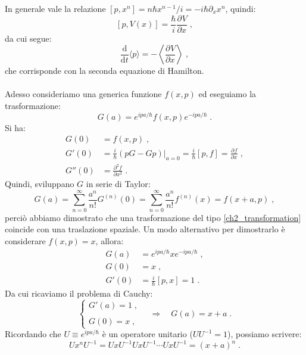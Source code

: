 \documentclass[10pt,a4paper]{report}
\theoremstyle{definition}
\newcommand{\pdev}[3][]{\frac{\partial^{#1} #2}{\partial #3^{#1}}}
\numberwithin{equation}{section}
\newcommand{\diff}[1][]{\mathrm{d}#1}
\newcommand{\bra}{\langle}
\newcommand{\ket}{\rangle}
\begin{document}
In generale vale la relazione $[p,x^n]=n\hbar x^{n-1}/i=-i\hbar\partial_x x^n$, quindi:
$$
[p,V(x)]=\frac{\hbar}{i}\pdev{V}{x}\;,
$$
da cui segue:
\begin{equation}
\frac{\mathrm{d}}{\diff{t}}\bra p\ket=-\left\langle\pdev{V}{x}\right\rangle\;,
\end{equation}
che corrisponde con la seconda equazione di Hamilton. \\
\\
Adesso consideriamo una generica funzione $f(x,p)$ ed eseguiamo la trasformazione:
\begin{equation}
G(a)=e^{ipa/\hbar}f(x,p)e^{-ipa/\hbar}\;. \label{ch2_transformation}
\end{equation}
Si ha:
\begin{align*}
G(0) &=f(x,p)\;, \\
G'(0) &= \frac{i}{\hbar}\left.(pG-Gp)\right|_{a=0}=\frac{i}{\hbar}[p,f]=\pdev{f}{x}\;, \\
G''(0) &= \pdev[2]{f}{x}\;.
\end{align*}
Quindi, sviluppano $G$ in serie di Taylor:
$$
G(a)=\sum_{n=0}^{\infty}\frac{a^n}{n!}G^{(n)}(0)=\sum_{n=0}^{\infty} \frac{a^n}{n!}f^{(n)}(x)=f(x+a,p)\;,
$$
perciò abbiamo dimostrato che una trasformazione del tipo \eqref{ch2_transformation} coincide con una traslazione spaziale. Un modo alternativo per dimostrarlo è considerare $f(x,p)=x$, allora:
\begin{align*}
G(a) &= e^{ipa/\hbar}xe^{-ipa/\hbar}\;, \\
G(0) &= x\;, \\
G'(0)&=\frac{i}{\hbar}[p,x]=1\;.
\end{align*}
Da cui ricaviamo il problema di Cauchy:
\begin{equation}
\begin{cases}
G'(a)=1\;, \\
\\
G(0)=x\;,
\end{cases}\quad \Longrightarrow\quad G(a)=x+a\;.
\end{equation}
Ricordando che $U\equiv e^{ipa/\hbar}$ è un operatore unitario ($UU^{-1}=1$), possiamo scrivere:
$$
Ux^nU^{-1}=UxU^{-1}UxU^{-1}\cdots UxU^{-1}=(x+a)^n\;.
$$
\end{document}
